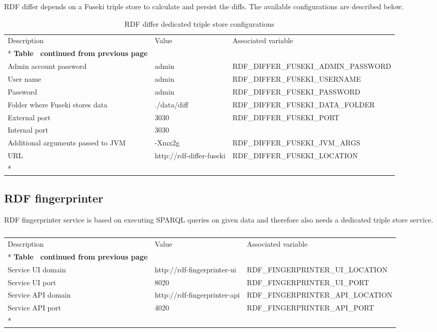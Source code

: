 	RDF differ depends on a Fuseki triple store to calculate and persist the diffs. The available configurations are described below. 

	\begin{longtable}[c]{@{}p{4cm}p{2cm}l@{}}
		\toprule
		Description & Value & Associated variable \\* \midrule
		\endfirsthead
		\multicolumn{3}{c}%
		{{\bfseries Table \thetable\ continued from previous page}} \\
		\endhead
		\bottomrule
		\endfoot
		\endlastfoot
		Admin account password & admin & RDF\_DIFFER\_FUSEKI\_ADMIN\_PASSWORD \\
		User name & admin & RDF\_DIFFER\_FUSEKI\_USERNAME \\
		Password & admin & RDF\_DIFFER\_FUSEKI\_PASSWORD \\
		Folder where Fuseki stores data & ./data/diff & RDF\_DIFFER\_FUSEKI\_DATA\_FOLDER \\
		External port & 3030 & RDF\_DIFFER\_FUSEKI\_PORT \\
		Internal port & 3030 &  \\
		Additional arguments passed to JVM & -Xmx2g & RDF\_DIFFER\_FUSEKI\_JVM\_ARGS \\
		URL & http://rdf-differ-fuseki & RDF\_DIFFER\_FUSEKI\_LOCATION \\* \bottomrule
		\caption{RDF differ dedicated triple store configurations}
		\label{tab:my-table2}\\
	\end{longtable}
	
	\subsection{RDF fingerprinter}
	
	RDF fingerprinter service is based on executing SPARQL queries on given data and therefore also needs a dedicated triple store service. 

	\begin{longtable}[c]{@{}p{3.8cm}p{3cm}l@{}}
		\toprule
		Description & Value & Associated variable \\* \midrule
		\endfirsthead
		\multicolumn{3}{c}%
		{{\bfseries Table \thetable\ continued from previous page}} \\
		\endhead
		\bottomrule
		\endfoot
		\endlastfoot
		Service UI domain & http://rdf-fingerprinter-ui & RDF\_FINGERPRINTER\_UI\_LOCATION \\
		Service UI port & 8020 & RDF\_FINGERPRINTER\_UI\_PORT \\
		Service API domain & http://rdf-fingerprinter-api & RDF\_FINGERPRINTER\_API\_LOCATION \\
		Service API port & 4020 & RDF\_FINGERPRINTER\_API\_PORT \\* \bottomrule
		\caption{}
		\label{tab:my-table7}\\
	\end{longtable}


